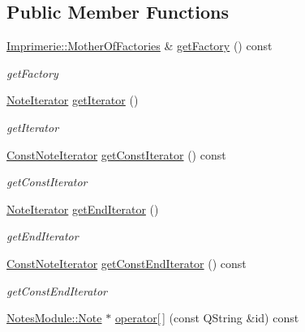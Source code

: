 \subsection*{Public Member Functions}
\begin{DoxyCompactItemize}
\item 
\hyperlink{class_imprimerie_1_1_mother_of_factories}{Imprimerie\-::\-Mother\-Of\-Factories} \& \hyperlink{classmanagers_1_1_notes_manager_a86435bd2709e7caefad39850a0b9b86a}{get\-Factory} () const 
\begin{DoxyCompactList}\small\item\em get\-Factory \end{DoxyCompactList}\item 
\hyperlink{classmanagers_1_1_notes_manager_a5cc8bcf779f41be7de324080a7a4e80d}{Note\-Iterator} \hyperlink{classmanagers_1_1_notes_manager_a81cb615bd3401e893729c3143dd97bea}{get\-Iterator} ()
\begin{DoxyCompactList}\small\item\em get\-Iterator \end{DoxyCompactList}\item 
\hyperlink{classmanagers_1_1_notes_manager_ac3a1b286533c5c0b96f0690e5a1ed5f6}{Const\-Note\-Iterator} \hyperlink{classmanagers_1_1_notes_manager_afb69ae6f2a14c16dab8f8b9cb3fb23bb}{get\-Const\-Iterator} () const 
\begin{DoxyCompactList}\small\item\em get\-Const\-Iterator \end{DoxyCompactList}\item 
\hyperlink{classmanagers_1_1_notes_manager_a5cc8bcf779f41be7de324080a7a4e80d}{Note\-Iterator} \hyperlink{classmanagers_1_1_notes_manager_aa394d46a707626b9c971e63ed5009152}{get\-End\-Iterator} ()
\begin{DoxyCompactList}\small\item\em get\-End\-Iterator \end{DoxyCompactList}\item 
\hyperlink{classmanagers_1_1_notes_manager_ac3a1b286533c5c0b96f0690e5a1ed5f6}{Const\-Note\-Iterator} \hyperlink{classmanagers_1_1_notes_manager_a63ef328e935bc5f2bc986fdbb838ad6d}{get\-Const\-End\-Iterator} () const 
\begin{DoxyCompactList}\small\item\em get\-Const\-End\-Iterator \end{DoxyCompactList}\item 
\hyperlink{class_notes_module_1_1_note}{Notes\-Module\-::\-Note} $\ast$ \hyperlink{classmanagers_1_1_notes_manager_a0489195296763bd922d091277041ba20}{operator\mbox{[}$\,$\mbox{]}} (const Q\-String \&id) const 

\end{DoxyCompactItemize}
